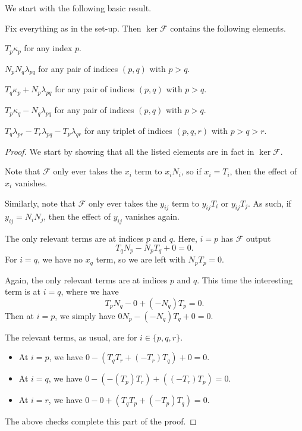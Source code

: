 \documentclass{article}
\numberwithin{equation}{section}
\begin{document}
We start with the following basic result.
\begin{lemma} \label{lem:getgens}
	Fix everything as in the set-up. Then $\ker\mathcal F$ contains the following elements.
	\begin{listalph}
		\item $T_p\kappa_p$ for any index $p$.
		\item $N_pN_q\lambda_{pq}$ for any pair of indices $(p,q)$ with $p>q$.
		\item $T_q\kappa_p+N_p\lambda_{pq}$ for any pair of indices $(p,q)$ with $p>q$.
		\item $T_p\kappa_q-N_q\lambda_{pq}$ for any pair of indices $(p,q)$ with $p>q$.
		\item $T_q\lambda_{pr}-T_r\lambda_{pq}-T_p\lambda_{qr}$ for any triplet of indices $(p,q,r)$ with $p>q>r$.
	\end{listalph}
\end{lemma}
\begin{proof}
	We start by showing that all the listed elements are in fact in $\ker\mathcal F$.
	\begin{listalph}
		\item Note that $\mathcal F$ only ever takes the $x_i$ term to $x_iN_i$, so if $x_i=T_i$, then the effect of $x_i$ vanishes.
		\item Similarly, note that $\mathcal F$ only ever takes the $y_{ij}$ term to $y_{ij}T_i$ or $y_{ij}T_j$. As such, if $y_{ij}=N_iN_j$, then the effect of $y_{ij}$ vanishes again.
		\item The only relevant terms are at indices $p$ and $q$. Here, $i=p$ has $\mathcal F$ output
		\[T_qN_p-N_pT_q+0=0.\]
		For $i=q$, we have no $x_q$ term, so we are left with $N_pT_p=0$.
		\item Again, the only relevant terms are at indices $p$ and $q$. This time the interesting term is at $i=q$, where we have
		\[T_pN_q-0+(-N_q)T_p=0.\]
		Then at $i=p$, we simply have $0N_p-(-N_q)T_q+0=0$.
		\item The relevant terms, as usual, are for $i\in\{p,q,r\}$.
		\begin{itemize}
			\item At $i=p$, we have $0-(T_qT_r+(-T_r)T_q)+0=0.$
			\item At $i=q$, we have $0-(-(T_p)T_r)+((-T_r)T_p)=0$.
			\item At $i=r$, we have $0-0+(T_qT_p+(-T_p)T_q)=0$.
		\end{itemize}
	\end{listalph}
	The above checks complete this part of the proof.
\end{proof}
\end{document}

